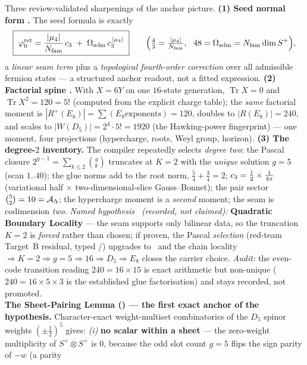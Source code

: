 \begin{keybox}
Three review-validated sharpenings of the anchor picture. \textbf{(1) Seed normal form \mE.} The seed
formula is exactly
\[
  \boxed{\ \phiz=\frac{|\mu_4|}{\Nfam}\,\cthree\;+\;\Oadm\,\cthree^{\,|\mu_4|}\ }
  \qquad\Bigl(\tfrac43=\tfrac{|\mu_4|}{\Nfam},\ \ 48=\Oadm=\Nfam\dim S^+\Bigr),
\]
a \emph{linear seam term} plus a \emph{topological fourth-order correction} over all admissible fermion
states --- a structured anchor readout, not a fitted expression. \textbf{(2) Factorial spine \mE.} With
$X=6Y$ on one $16$-state generation, $\operatorname{Tr}X=0$ and $\operatorname{Tr}X^2=120=5!$ (computed
from the explicit charge table); the \emph{same} factorial moment is $|R^+(E_8)|=\sum(\text{$E_8$
exponents})=120$, doubles to $|R(E_8)|=240$, and scales to $|W(D_5)|=2^4\cdot5!=1920$ (the Hawking-power
fingerprint) --- one moment, four projections (hypercharge, roots, Weyl group, horizon). \textbf{(3) The
degree-$2$ inventory.} The compiler repeatedly selects \emph{degree two}: the Pascal closure
$2^{g-1}=\sum_{k\le2}\binom gk$ truncates at $K{=}2$ with the \emph{unique} solution $g=5$ (scan
$1..40$); the glue norms add to the root norm, $\tfrac54+\tfrac34=2$; $c_3=\tfrac12\times\tfrac1{4\pi}$
(variational half $\times$ two-dimensional-slice Gauss--Bonnet); the pair sector $\binom52=10=\mathcal A_\Lambda$; the
hypercharge moment is a \emph{second} moment; the seam is codimension \emph{two}. \emph{Named hypothesis
\mC\ (recorded, not claimed):} \textbf{Quadratic Boundary Locality} --- the seam supports only bilinear
data, so the truncation $K=2$ is \emph{forced} rather than chosen; if proven, the Pascal \emph{selection}
(red-team Target~B residual, typed \mO/\mC) upgrades to \mE\ and the chain locality $\Rightarrow K{=}2
\Rightarrow g{=}5\Rightarrow16\Rightarrow D_5\Rightarrow E_8$ closes the carrier choice. \emph{Audit:}
the even-code transition reading $240=16\times15$ is exact arithmetic but non-unique ($240=16\times5\times3$
is the established glue factorisation) and stays recorded, not promoted.
\smallskip\\
\noindent\textbf{The Sheet-Pairing Lemma () --- the first exact anchor of
the hypothesis.} Character-exact weight-multiset combinatorics of the $D_5$ spinor weights
$(\pm\tfrac12)^5$ gives: \emph{(i)} \textbf{no scalar within a sheet} --- the zero-weight multiplicity of
$S^+\!\otimes S^+$ is $0$, because the odd slot count $g=5$ flips the sign parity of $-w$ (a parity

\end{keybox}
